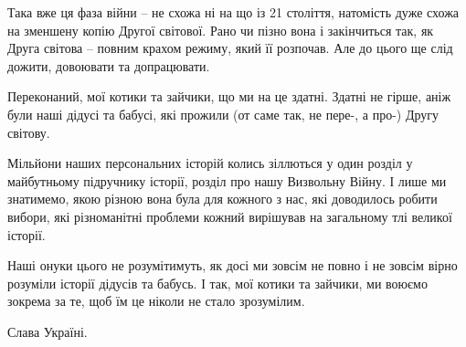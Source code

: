 Така вже ця фаза війни – не схожа ні на що із 21 століття, натомість дуже схожа
на зменшену копію Другої світової. Рано чи пізно вона і закінчиться так, як
Друга світова – повним крахом режиму, який її розпочав. Але до цього ще слід
дожити, довоювати та допрацювати.

Переконаний, мої котики та зайчики, що ми на це здатні. Здатні не гірше, аніж
були наші дідусі та бабусі, які прожили (от саме так, не пере-, а про-) Другу
світову. 

Мільйони наших персональних історій колись зіллються у один розділ у
майбутньому підручнику історії, розділ про нашу Визвольну Війну. І лише ми
знатимемо, якою різною вона була для кожного з нас, які доводилось робити
вибори, які різноманітні проблеми кожний вирішував на загальному тлі великої
історії. 

Наші онуки цього не розумітимуть, як досі ми зовсім не повно і не зовсім вірно
розуміли історії дідусів та бабусь. І так, мої котики та зайчики, ми воюємо
зокрема за те, щоб їм це ніколи не стало зрозумілим.

Слава Україні.
